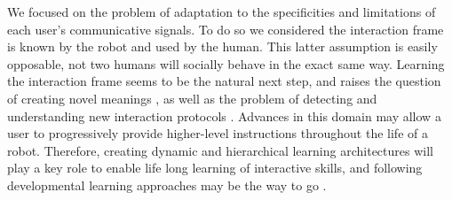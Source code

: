 We focused on the problem of adaptation to the specificities and limitations of each user's communicative signals. To do so we considered the interaction frame is known by the robot and used by the human. This latter assumption is easily opposable, not two humans will socially behave in the exact same way. Learning the interaction frame seems to be the natural next step, and raises the question of creating novel meanings \cite{steels2002aibos}, as well as the problem of detecting and understanding new interaction protocols \cite{mohammad2010learning,macl11simul}. Advances in this domain may allow a user to progressively provide higher-level instructions throughout the life of a robot. Therefore, creating dynamic and hierarchical learning architectures will play a key role to enable life long learning of interactive skills, and following developmental learning approaches may be the way to go \cite{lungarella2003developmental,demiris2005motor,lopes2007developmental}.











